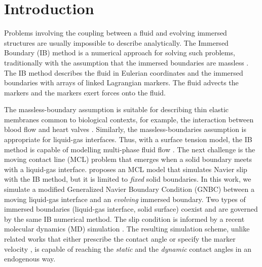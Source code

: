 \documentclass{jfm}
\begin{document}
\section{Introduction}
Problems involving the coupling between a fluid and evolving immersed structures are usually impossible to describe analytically. The Immersed Boundary (IB) method is a numerical approach for solving such problems, traditionally with the assumption that the immersed boundaries are massless \citep{peskin1972flow}. The IB method describes the fluid in Eulerian coordinates and the immersed boundaries with arrays of linked Lagrangian markers. The fluid advects the markers and the markers exert forces onto the fluid. 

The massless-boundary assumption is suitable for describing thin elastic membranes common to biological contexts, for example, the interaction between blood flow and heart valves \citep{peskin1972flow}. Similarly, the massless-boundaries assumption is appropriate for liquid-gas interfaces. Thus, with a surface tension model, the IB method is capable of modelling multi-phase fluid flow \citep{surface_tension_review, surface_tension_IB_estimates_curvature, multi_phase_2018, assessment_VOF_vs_IB}. The next challenge is the moving contact line (MCL) problem that emerges when a solid boundary meets with a liquid-gas interface. \citet{MCL_IBM_surfactant} proposes an MCL model that simulates Navier slip with the IB method, but it is limited to \textit{fixed} solid boundaries. In this work, we simulate a modified Generalized Navier Boundary Condition (GNBC) between a moving liquid-gas interface and an \textit{evolving} immersed boundary. Two types of immersed boundaries (liquid-gas interface, solid surface) coexist and are governed by the same IB numerical method. The slip condition is informed by a recent molecular dynamics (MD) simulation \citep{MD_2018_its_the_bonds}. The resulting simulation scheme, unlike related works that either prescribe the contact angle \citep{curved_solid_DI_IB, muradoglu2010front} or specify the marker velocity \citep{manservisi2009variational}, is capable of reaching the \textit{static} and the \textit{dynamic} contact angles in an endogenous way. 
\end{document}
